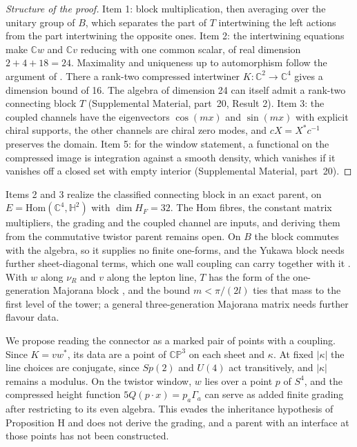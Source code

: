 \documentclass[aps,prd,reprint,onecolumn,nofootinbib,amsmath,amssymb,floatfix]{revtex4-2}
\theoremstyle{plain}
\newcommand{\supp}[1]{Supplemental Material, part~#1}
\newcommand{\C}{\mathbb C}
\renewcommand{\H}{\mathbb H}
\begin{document}
\begin{proof}[Structure of the proof]
Item 1: block multiplication, then averaging over the unitary group of $B$, which separates the part of $T$ intertwining the left actions from the part intertwining the opposite ones. Item 2: the intertwining equations make $\C w$ and $\C v$ reducing with one common scalar, of real dimension $2+4+18=24$. Maximality and uniqueness up to automorphism follow the argument of \cite{CC2008}. There a rank-two compressed intertwiner $K:\C^2\to\C^4$ gives a dimension bound of 16. The algebra of dimension 24 can itself admit a rank-two connecting block $T$ (\supp{20}, Result 2). Item 3: the coupled channels have the eigenvectors $\cos(mx)$ and $\sin(mx)$ with explicit chiral supports, the other channels are chiral zero modes, and $cX=X^*c^{-1}$ preserves the domain. Item 5: for the window statement, a functional on the compressed image is integration against a smooth density, which vanishes if it vanishes off a closed set with empty interior (\supp{20}).
\end{proof}

Items 2 and 3 realize the classified connecting block in an exact parent, on $E=\mathrm{Hom}(\C^4,\H^2)$ with $\dim H_F=32$. The Hom fibres, the constant matrix multipliers, the grading and the coupled channel are inputs, and deriving them from the commutative twistor parent remains open. On $B$ the block commutes with the algebra, so it supplies no finite one-forms, and the Yukawa block needs further sheet-diagonal terms, which one wall coupling can carry together with it \cite{boundarynote}. With $w$ along $\nu_R$ and $v$ along the lepton line, $T$ has the form of the one-generation Majorana block \cite{CCM2007}, and the bound $m<\pi/(2l)$ ties that mass to the first level of the tower; a general three-generation Majorana matrix needs further flavour data.

We propose reading the connector as a marked pair of points with a coupling. Since $K=vw^*$, its data are a point of $\mathbb{CP}^3$ on each sheet and $\kappa$. At fixed $|\kappa|$ the line choices are conjugate, since $Sp(2)$ and $U(4)$ act transitively, and $|\kappa|$ remains a modulus. On the twistor window, $w$ lies over a point $p$ of $S^4$, and the compressed height function $5Q(p\cdot x)=p_a\Gamma_a$ can serve as added finite grading after restricting to its even algebra. This evades the inheritance hypothesis of Proposition H and does not derive the grading, and a parent with an interface at those points has not been constructed.
\end{document}
